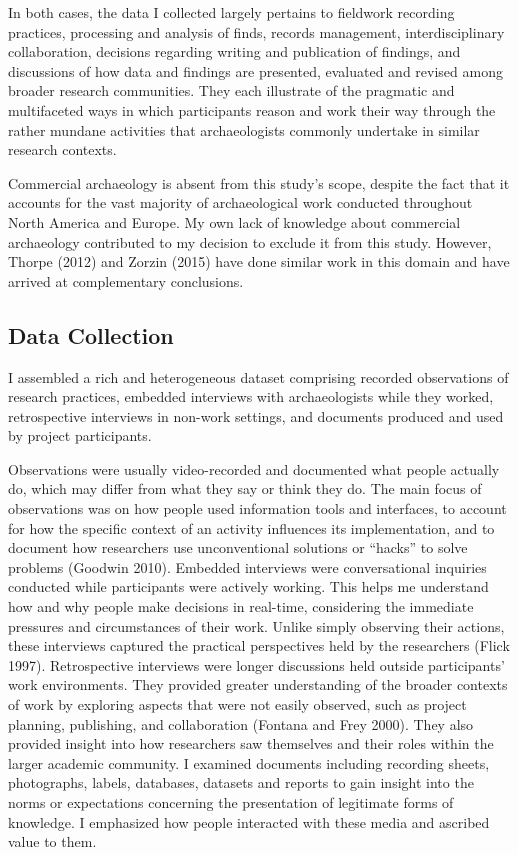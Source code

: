 \documentclass[
  canadian,
]{article}
\begin{document}
In both cases, the data I collected largely pertains to fieldwork
recording practices, processing and analysis of finds, records
management, interdisciplinary collaboration, decisions regarding writing
and publication of findings, and discussions of how data and findings
are presented, evaluated and revised among broader research communities.
They each illustrate of the pragmatic and multifaceted ways in which
participants reason and work their way through the rather mundane
activities that archaeologists commonly undertake in similar research
contexts.

Commercial archaeology is absent from this study's scope, despite the
fact that it accounts for the vast majority of archaeological work
conducted throughout North America and Europe. My own lack of knowledge
about commercial archaeology contributed to my decision to exclude it
from this study. However, Thorpe (2012) and Zorzin (2015) have done
similar work in this domain and have arrived at complementary
conclusions.

\subsection{Data Collection}\label{data-collection}

I assembled a rich and heterogeneous dataset comprising recorded
observations of research practices, embedded interviews with
archaeologists while they worked, retrospective interviews in non-work
settings, and documents produced and used by project participants.

Observations were usually video-recorded and documented what people
actually do, which may differ from what they say or think they do. The
main focus of observations was on how people used information tools and
interfaces, to account for how the specific context of an activity
influences its implementation, and to document how researchers use
unconventional solutions or ``hacks'' to solve problems (Goodwin 2010).
Embedded interviews were conversational inquiries conducted while
participants were actively working. This helps me understand how and why
people make decisions in real-time, considering the immediate pressures
and circumstances of their work. Unlike simply observing their actions,
these interviews captured the practical perspectives held by the
researchers (Flick 1997). Retrospective interviews were longer
discussions held outside participants' work environments. They provided
greater understanding of the broader contexts of work by exploring
aspects that were not easily observed, such as project planning,
publishing, and collaboration (Fontana and Frey 2000). They also
provided insight into how researchers saw themselves and their roles
within the larger academic community. I examined documents including
recording sheets, photographs, labels, databases, datasets and reports
to gain insight into the norms or expectations concerning the
presentation of legitimate forms of knowledge. I emphasized how people
interacted with these media and ascribed value to them.
\end{document}
